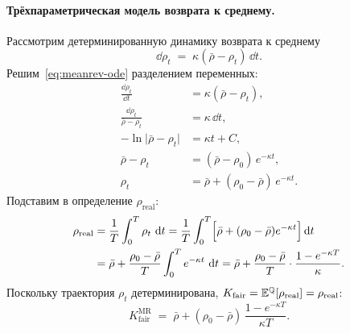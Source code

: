 \paragraph{Трёхпараметрическая модель возврата к среднему.}
Рассмотрим детерминированную динамику возврата к среднему
\begin{equation}
\label{eq:meanrev-ode}
  \dd \rho_t \;=\; \kappa(\bar\rho - \rho_t)\,\dd t.
\end{equation}
Решим~\eqref{eq:meanrev-ode} разделением переменных:
\begin{align*}
  \frac{\dd\rho_t}{\dd t} &= \kappa(\bar\rho - \rho_t),\\
  \frac{\dd\rho_t}{\bar\rho - \rho_t} &= \kappa\,\dd t,\\
  -\ln\!\bigl|\bar\rho - \rho_t\bigr| &= \kappa t + C,\\
  \bar\rho - \rho_t &= (\bar\rho - \rho_0)\,e^{-\kappa t},\\
  \rho_t &= \bar\rho + (\rho_0 - \bar\rho)\,e^{-\kappa t}.
\end{align*}
Подставим в определение $\rho_{\text{real}}$:
\begin{align*}
  \rho_{\text{real}}
  &= \frac{1}{T}\int_{0}^{T}\rho_t\,\,\mathrm{d} t
  = \frac{1}{T}\int_{0}^{T}\Bigl[\bar\rho + (\rho_0-\bar\rho)e^{-\kappa t}\Bigr]\,\mathrm{d} t \\
  &= \bar\rho + \frac{\rho_0-\bar\rho}{T}\int_{0}^{T}e^{-\kappa t}\,\,\mathrm{d} t
  = \bar\rho + \frac{\rho_0-\bar\rho}{T}\cdot\frac{1-e^{-\kappa T}}{\kappa}.
\end{align*}
Поскольку траектория $\rho_t$ детерминирована, $K_{\text{fair}} = \mathbb{E}^{\mathbb{Q}}[\rho_{\text{real}}] = \rho_{\text{real}}$:
\begin{equation}
\label{eq:fair-meanrev}
  \boxed{\;K_{\text{fair}}^{\text{MR}}
  \;=\; \bar\rho + (\rho_0-\bar\rho)\,\frac{1-e^{-\kappa T}}{\kappa T}.\;}
\end{equation}

